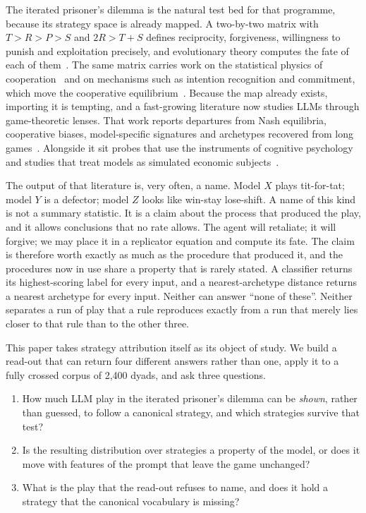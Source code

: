 \documentclass[11pt,a4paper]{article}
\begin{document}
The iterated prisoner's dilemma is the natural test bed for that programme,
because its strategy space is already mapped. A two-by-two matrix with $T > R
> P > S$ and $2R > T + S$ defines reciprocity, forgiveness, willingness to
punish and exploitation precisely, and evolutionary theory computes the fate
of each of
them~\citep{axelrod1981evolution,axelrod1984evolution,nowak1992tit,nowak1993strategy,nowak2006five,press2012iterated}.
The same matrix carries work on the statistical physics of
cooperation~\citep{szabo2007evolutionary,perc2010coevolutionary,perc2017statistical}
and on mechanisms such as intention recognition and commitment, which move the
cooperative equilibrium~\citep{han2011intention,han2013good}. Because the map
already exists, importing it is tempting, and a fast-growing literature now
studies LLMs through game-theoretic lenses. That work reports departures from
Nash equilibria, cooperative biases, model-specific signatures and archetypes
recovered from long
games~\citep{akata2023playing,phelps2023investigating,fontana2024nicer,mei2024turing,lore2024strategic}.
Alongside it sit probes that use the instruments of cognitive
psychology~\citep{binz2023using} and studies that treat models as simulated
economic subjects~\citep{horton2023large,aher2023using,argyle2023out}.

The output of that literature is, very often, a name. Model $X$ plays
tit-for-tat; model $Y$ is a defector; model $Z$ looks like win-stay
lose-shift. A name of this kind is not a summary statistic. It is a claim
about the process that produced the play, and it allows conclusions that no
rate allows. The agent will retaliate; it will forgive; we may place it in a
replicator equation and compute its fate. The claim is therefore worth exactly
as much as the procedure that produced it, and the procedures now in use share
a property that is rarely stated. A classifier returns its highest-scoring
label for every input, and a nearest-archetype distance returns a nearest
archetype for every input. Neither can answer ``none of these''. Neither
separates a run of play that a rule reproduces exactly from a run that merely
lies closer to that rule than to the other three.

This paper takes strategy attribution itself as its object of study. We build
a read-out that can return four different answers rather than one, apply it to
a fully crossed corpus of 2{,}400 dyads, and ask three questions.

\begin{enumerate}
\item How much LLM play in the iterated prisoner's dilemma can be \emph{shown},
      rather than guessed, to follow a canonical strategy, and which strategies
      survive that test?
\item Is the resulting distribution over strategies a property of the model, or
      does it move with features of the prompt that leave the game unchanged?
\item What is the play that the read-out refuses to name, and does it hold a
      strategy that the canonical vocabulary is missing?
\end{enumerate}
\end{document}
